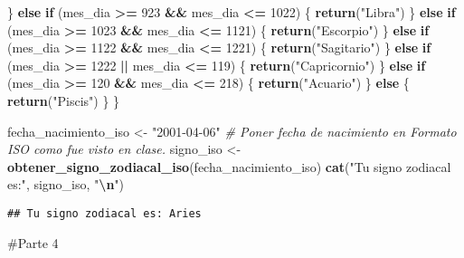 \documentclass[
]{article}
\newenvironment{Shaded}{\begin{snugshade}}{\end{snugshade}}
\newcommand{\CommentTok}[1]{\textcolor[rgb]{0.56,0.35,0.01}{\textit{#1}}}
\newcommand{\ControlFlowTok}[1]{\textcolor[rgb]{0.13,0.29,0.53}{\textbf{#1}}}
\newcommand{\DecValTok}[1]{\textcolor[rgb]{0.00,0.00,0.81}{#1}}
\newcommand{\FunctionTok}[1]{\textcolor[rgb]{0.13,0.29,0.53}{\textbf{#1}}}
\newcommand{\NormalTok}[1]{#1}
\newcommand{\OtherTok}[1]{\textcolor[rgb]{0.56,0.35,0.01}{#1}}
\newcommand{\SpecialCharTok}[1]{\textcolor[rgb]{0.81,0.36,0.00}{\textbf{#1}}}
\newcommand{\StringTok}[1]{\textcolor[rgb]{0.31,0.60,0.02}{#1}}
\begin{document}
\begin{Shaded}
\begin{Highlighting}[]
\NormalTok{  \} }\ControlFlowTok{else} \ControlFlowTok{if}\NormalTok{ (mes\_dia }\SpecialCharTok{\textgreater{}=} \DecValTok{923} \SpecialCharTok{\&\&}\NormalTok{ mes\_dia }\SpecialCharTok{\textless{}=} \DecValTok{1022}\NormalTok{) \{}
    \FunctionTok{return}\NormalTok{(}\StringTok{"Libra"}\NormalTok{)}
\NormalTok{  \} }\ControlFlowTok{else} \ControlFlowTok{if}\NormalTok{ (mes\_dia }\SpecialCharTok{\textgreater{}=} \DecValTok{1023} \SpecialCharTok{\&\&}\NormalTok{ mes\_dia }\SpecialCharTok{\textless{}=} \DecValTok{1121}\NormalTok{) \{}
    \FunctionTok{return}\NormalTok{(}\StringTok{"Escorpio"}\NormalTok{)}
\NormalTok{  \} }\ControlFlowTok{else} \ControlFlowTok{if}\NormalTok{ (mes\_dia }\SpecialCharTok{\textgreater{}=} \DecValTok{1122} \SpecialCharTok{\&\&}\NormalTok{ mes\_dia }\SpecialCharTok{\textless{}=} \DecValTok{1221}\NormalTok{) \{}
    \FunctionTok{return}\NormalTok{(}\StringTok{"Sagitario"}\NormalTok{)}
\NormalTok{  \} }\ControlFlowTok{else} \ControlFlowTok{if}\NormalTok{ (mes\_dia }\SpecialCharTok{\textgreater{}=} \DecValTok{1222} \SpecialCharTok{||}\NormalTok{ mes\_dia }\SpecialCharTok{\textless{}=} \DecValTok{119}\NormalTok{) \{}
    \FunctionTok{return}\NormalTok{(}\StringTok{"Capricornio"}\NormalTok{)}
\NormalTok{  \} }\ControlFlowTok{else} \ControlFlowTok{if}\NormalTok{ (mes\_dia }\SpecialCharTok{\textgreater{}=} \DecValTok{120} \SpecialCharTok{\&\&}\NormalTok{ mes\_dia }\SpecialCharTok{\textless{}=} \DecValTok{218}\NormalTok{) \{}
    \FunctionTok{return}\NormalTok{(}\StringTok{"Acuario"}\NormalTok{)}
\NormalTok{  \} }\ControlFlowTok{else}\NormalTok{ \{}
    \FunctionTok{return}\NormalTok{(}\StringTok{"Piscis"}\NormalTok{)}
\NormalTok{  \}}
\NormalTok{\}}

\NormalTok{fecha\_nacimiento\_iso }\OtherTok{\textless{}{-}} \StringTok{"2001{-}04{-}06"} \CommentTok{\# Poner fecha de nacimiento en Formato ISO como fue visto en clase.}
\NormalTok{signo\_iso }\OtherTok{\textless{}{-}} \FunctionTok{obtener\_signo\_zodiacal\_iso}\NormalTok{(fecha\_nacimiento\_iso)}
\FunctionTok{cat}\NormalTok{(}\StringTok{"Tu signo zodiacal es:"}\NormalTok{, signo\_iso, }\StringTok{"}\SpecialCharTok{\textbackslash{}n}\StringTok{"}\NormalTok{)}
\end{Highlighting}
\end{Shaded}

\begin{verbatim}
## Tu signo zodiacal es: Aries
\end{verbatim}

\#Parte 4
\end{document}
